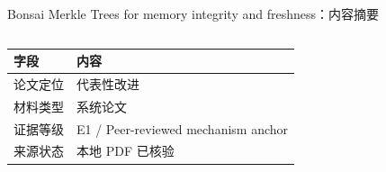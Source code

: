 \begin{frame}[t,shrink=6]{Bonsai Merkle Trees for memory integrity and freshness：内容摘要}
\begin{columns}[T,totalwidth=\textwidth]
\begin{column}{0.49\textwidth}
{\begin{minipage}[t]{0.97\linewidth}
    \vspace{1.1mm}
    \hspace{1.4mm}\begin{minipage}{0.92\linewidth}
      \scriptsize {\tiny
\begin{tabularx}{\linewidth}{@{}YY@{}}
\toprule
\textbf{字段} & \textbf{内容} \\
\midrule
论文定位 & 代表性改进 \\
材料类型 & 系统论文 \\
证据等级 & E1 / Peer-reviewed mechanism anchor \\
来源状态 & 本地 PDF 已核验 \\
\bottomrule
\end{tabularx}
}
    \end{minipage}
    \vspace{1mm}
  \end{minipage}}
  \end{column}
\end{columns}
\end{frame}


